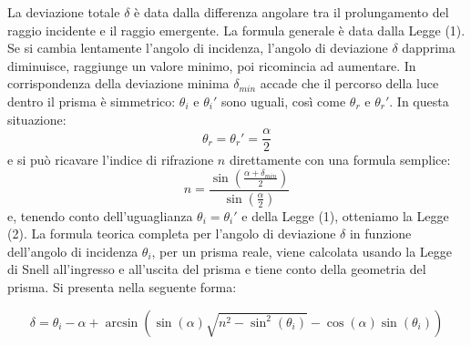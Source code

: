 La deviazione totale $\delta$ è data dalla differenza angolare tra il prolungamento del raggio incidente e il raggio emergente. La formula generale è data dalla Legge (1). Se si cambia lentamente l'angolo di incidenza, l'angolo di deviazione $\delta$ dapprima diminuisce, raggiunge un valore minimo, poi ricomincia ad aumentare. In corrispondenza della deviazione minima $\delta_{min}$ accade che il percorso della luce dentro il prisma è simmetrico: $\theta_i$ e $\theta_i'$ sono uguali, così come $\theta_r$ e $\theta_r'$. In questa situazione:
\begin{equation}
	\theta_r = \theta_r'=\frac{\alpha}{2}
\end{equation}
e si può ricavare l'indice di rifrazione $n$ direttamente con una formula semplice:
\begin{equation}
	n=\frac{\sin\left(\frac{\alpha+\delta_{min}}{2}\right)}{\sin\left(\frac{\alpha}{2}\right)}
\end{equation}
e, tenendo conto dell'uguaglianza $\theta_i=\theta_i'$ e della Legge (1), otteniamo la Legge (2). La formula teorica completa per l'angolo di deviazione $\delta$ in funzione dell'angolo di incidenza $\theta_i$, per un prisma reale, viene calcolata usando la Legge di Snell all'ingresso e all'uscita del prisma e tiene conto della geometria del prisma. Si presenta nella seguente forma:

\begin{equation}
	\delta=\theta_i - \alpha + \arcsin\left(\sin(\alpha)\sqrt{n^2-\sin^2(\theta_i)}-\cos(\alpha)\sin(\theta_i)\right)
\end{equation}


